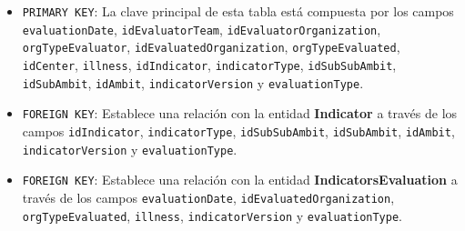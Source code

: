 \begin{itemize}
\begin{itemize}
      \item \texttt{PRIMARY KEY}: La clave principal de esta tabla está compuesta por los campos \texttt{evaluationDate}, \texttt{idEvaluatorTeam}, \texttt{idEvaluatorOrganization}, \texttt{orgTypeEvaluator}, \texttt{idEvaluatedOrganization}, \texttt{orgTypeEvaluated}, \texttt{idCenter}, \texttt{illness}, \texttt{idIndicator}, \texttt{indicatorType}, \texttt{idSubSubAmbit}, \texttt{idSubAmbit}, \texttt{idAmbit}, \texttt{indicatorVersion} y \texttt{evaluationType}.
      \item \texttt{FOREIGN KEY}: Establece una relación con la entidad \textbf{Indicator} a través de los campos \texttt{idIndicator}, \texttt{indicatorType}, \texttt{idSubSubAmbit}, \texttt{idSubAmbit}, \texttt{idAmbit}, \texttt{indicatorVersion} y \texttt{evaluationType}.
      \item \texttt{FOREIGN KEY}: Establece una relación con la entidad \textbf{IndicatorsEvaluation} a través de los campos \texttt{evaluationDate}, \texttt{idEvaluatedOrganization}, \texttt{orgTypeEvaluated}, \texttt{illness}, \texttt{indicatorVersion} y \texttt{evaluationType}.
    \end{itemize}
    


\end{itemize}
